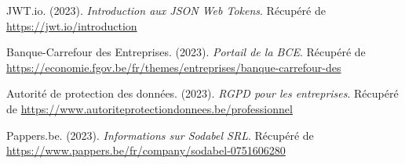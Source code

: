 \begin{thebibliography}{99}
JWT.io. (2023).
\textit{Introduction aux JSON Web Tokens}.
Récupéré de \url{https://jwt.io/introduction}

Banque-Carrefour des Entreprises. (2023).
\textit{Portail de la BCE}.
Récupéré de \url{https://economie.fgov.be/fr/themes/entreprises/banque-carrefour-des}

Autorité de protection des données. (2023).
\textit{RGPD pour les entreprises}.
Récupéré de \url{https://www.autoriteprotectiondonnees.be/professionnel}

Pappers.be. (2023).
\textit{Informations sur Sodabel SRL}.
Récupéré de \url{https://www.pappers.be/fr/company/sodabel-0751606280}

\end{thebibliography}
